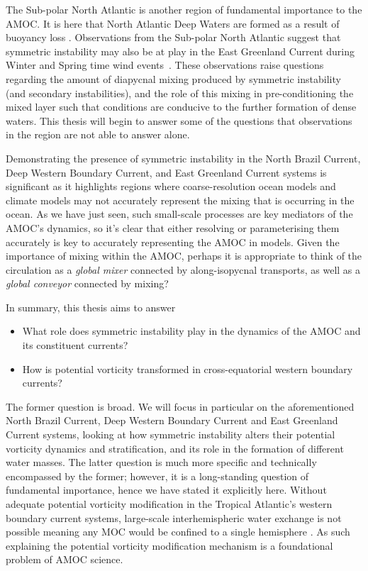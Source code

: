 
The Sub-polar North Atlantic is another region of fundamental importance to the AMOC. It is here that North Atlantic Deep Waters are formed as a result of buoyancy loss \citep[e.g.]{Marshall1999, Pickart2003, DeJong2016, Lozier2019}. Observations from the Sub-polar North Atlantic suggest that symmetric instability may also be at play in the East Greenland Current during Winter and Spring time wind events~\citep{LeBras2022}. These observations raise questions regarding the amount of diapycnal mixing produced by symmetric instability (and secondary instabilities), and the role of this mixing in pre-conditioning the mixed layer such that conditions are conducive to the further formation of dense waters. This thesis will begin to answer some of the questions that observations in the region are not able to answer alone.

Demonstrating the presence of symmetric instability in the North Brazil Current, Deep Western Boundary Current, and East Greenland Current systems is significant as it highlights regions where coarse-resolution ocean models and climate models may not accurately represent the mixing that is occurring in the ocean. As we have just seen, such small-scale processes are key mediators of the AMOC's dynamics, so it's clear that either resolving or parameterising them accurately is key to accurately representing the AMOC in models. Given the importance of mixing within the AMOC, perhaps it is appropriate to think of the circulation as a \textit{global mixer} connected by along-isopycnal transports, as well as a \textit{global conveyor} connected by mixing?

In summary, this thesis aims to answer 
\begin{itemize}
    \item What role does symmetric instability play in the dynamics of the AMOC and its constituent currents?
    \item How is potential vorticity transformed in cross-equatorial western boundary currents?
\end{itemize}
The former question is broad. We will focus in particular on the aforementioned North Brazil Current, Deep Western Boundary Current and East Greenland Current systems, looking at how symmetric instability alters their potential vorticity dynamics and stratification, and its role in the formation of different water masses. The latter question is much more specific and technically encompassed by the former; however, it is a long-standing question of fundamental importance, hence we have stated it explicitly here. Without adequate potential vorticity modification in the Tropical Atlantic's western boundary current systems, large-scale interhemispheric water exchange is not possible meaning any MOC would be confined to a single hemisphere \citep{Killworth1991, Nof1990, Csanady1985, Johnson1993}. As such explaining the potential vorticity modification mechanism is a foundational problem of AMOC science.

